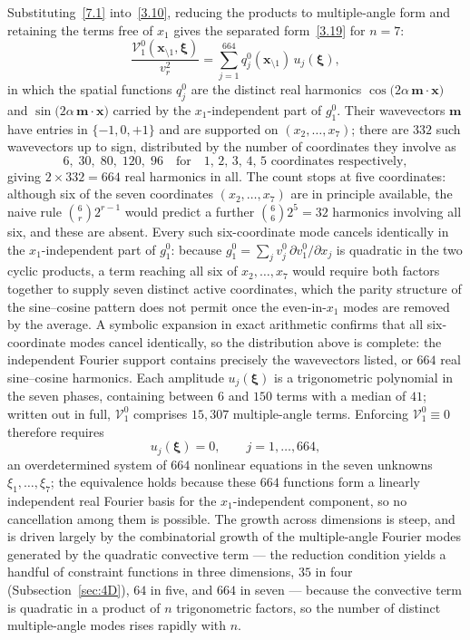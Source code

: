 \documentclass[11pt]{jfm}
\numberwithin{equation}{section}
\begin{document}
Substituting~\eqref{7.1} into~\eqref{3.10}, reducing the products to multiple-angle form and
retaining the terms free of $x_1$ gives the separated form~\eqref{3.19} for $n=7$:
\begin{equation}
\label{7.2}
\frac{\mathcal{V}_1^0(\boldsymbol{x}_{\setminus 1},\boldsymbol{\xi})}{v_r^2}
=\sum_{j=1}^{664} q_j^0(\boldsymbol{x}_{\setminus 1})\,u_j(\boldsymbol{\xi}),
\end{equation}
in which the spatial functions $q_j^0$ are the distinct real harmonics
$\cos\!\big(2\alpha\,\boldsymbol{m}\cdot\boldsymbol{x}\big)$ and
$\sin\!\big(2\alpha\,\boldsymbol{m}\cdot\boldsymbol{x}\big)$ carried by the $x_1$-independent
part of $g_1^0$. Their wavevectors $\boldsymbol{m}$ have entries in $\{-1,0,+1\}$ and are
supported on $(x_2,\dots,x_7)$; there are $332$ such wavevectors up to sign, distributed by the
number of coordinates they involve as
\begin{equation}
\label{7.3}
6,\;30,\;80,\;120,\;96 \quad\text{for}\quad 1,\,2,\,3,\,4,\,5 \text{ coordinates respectively},
\end{equation}
giving $2\times332=664$ real harmonics in all. The count stops at five coordinates: although six
of the seven coordinates $(x_2,\dots,x_7)$ are in principle available, the naive rule
$\binom{6}{r}2^{r-1}$ would predict a further $\binom{6}{6}2^{5}=32$ harmonics involving all six,
and these are absent. Every such six-coordinate mode cancels identically in the $x_1$-independent
part of $g_1^0$: because $g_1^0=\sum_j v_j^0\,\partial v_1^0/\partial x_j$ is quadratic in the two
cyclic products, a term reaching all six of $x_2,\dots,x_7$ would require both factors together to
supply seven distinct active coordinates, which the parity structure of the sine--cosine pattern
does not permit once the even-in-$x_1$ modes are removed by the average. A symbolic expansion in
exact arithmetic confirms that all six-coordinate modes cancel identically, so the distribution
above is complete: the independent Fourier support contains precisely the wavevectors listed, or
$664$ real sine--cosine harmonics. Each amplitude $u_j(\boldsymbol{\xi})$ is a
trigonometric polynomial in the seven phases, containing between $6$ and $150$ terms with a
median of $41$; written out in full, $\mathcal{V}_1^0$ comprises $15{,}307$ multiple-angle
terms. Enforcing $\mathcal{V}_1^0\equiv0$ therefore requires
\begin{equation}
\label{7.4}
u_j(\boldsymbol{\xi})=0,\qquad j=1,\dots,664,
\end{equation}
an overdetermined system of $664$ nonlinear equations in the seven unknowns
$\xi_1,\dots,\xi_7$; the equivalence holds because these $664$ functions form a linearly
independent real Fourier basis for the $x_1$-independent component, so no cancellation among them
is possible. The growth across dimensions is steep, and is driven largely by the combinatorial growth of the
multiple-angle Fourier modes generated by the quadratic convective term --- the
reduction condition yields a handful of constraint functions in three dimensions, $35$ in
four (Subsection~\ref{sec:4D}), $64$ in five, and $664$ in seven --- because the
convective term is quadratic in a product of $n$ trigonometric factors, so the number of
distinct multiple-angle modes rises rapidly with $n$.
\end{document}
